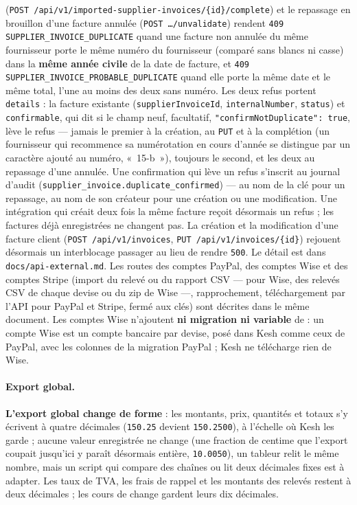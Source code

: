 \documentclass[a4paper,11pt,oneside]{article}
\begin{document}
\begin{sloppypar}
(\texttt{POST /api/v1/\allowbreak imported-supplier-invoices/\allowbreak\{id\}/\allowbreak complete}) et le repassage en brouillon d'une facture annulée (\texttt{POST …/unvalidate}) rendent \texttt{409 SUPPLIER\_\allowbreak INVOICE\_\allowbreak DUPLICATE} quand une facture non annulée du même fournisseur porte le même numéro du fournisseur (comparé sans blancs ni casse) dans la \textbf{même année civile} de la date de facture, et \texttt{409 SUPPLIER\_\allowbreak INVOICE\_\allowbreak PROBABLE\_\allowbreak DUPLICATE} quand elle porte la même date et le même total, l'une au moins des deux sans numéro. Les deux refus portent \texttt{details} : la facture existante (\texttt{supplierInvoiceId}, \texttt{internalNumber}, \texttt{status}) et \texttt{confirmable}, qui dit si le champ neuf, facultatif, \texttt{"confirmNotDuplicate": true}, lève le refus --- jamais le premier à la création, au \texttt{PUT} et à la complétion (un fournisseur qui recommence sa numérotation en cours d'année se distingue par un caractère ajouté au numéro, «~15-b~»), toujours le second, et les deux au repassage d'une annulée. Une confirmation qui lève un refus s'inscrit au journal d'audit (\texttt{supplier\_\allowbreak invoice.\allowbreak duplicate\_\allowbreak confirmed}) --- au nom de la clé pour un repassage, au nom de son créateur pour une création ou une modification. Une intégration qui créait deux fois la même facture reçoit désormais un refus ; les factures déjà enregistrées ne changent pas. La création et la modification d'une facture client (\texttt{POST /api/v1/\allowbreak invoices}, \texttt{PUT /api/v1/\allowbreak invoices/\allowbreak\{id\}}) rejouent désormais un interblocage passager au lieu de rendre \texttt{500}. Le détail est dans \texttt{docs/api-external.md}. Les routes des comptes PayPal, des comptes Wise et des comptes Stripe (import du relevé ou du rapport CSV --- pour Wise, des relevés CSV de chaque devise ou du zip de Wise ---, rapprochement, téléchargement par l'API pour PayPal et Stripe, fermé aux clés) sont décrites dans le même document. Les comptes Wise n'ajoutent \textbf{ni migration ni variable} de  : un compte Wise est un compte bancaire par devise, posé dans Kesh comme ceux de PayPal, avec les colonnes de la migration PayPal ; Kesh ne télécharge rien de Wise.
\end{sloppypar}

\paragraph{Export global.} \textbf{L'export global change de forme} : les montants, prix, quantités et totaux s'y écrivent à quatre décimales (\texttt{150.25} devient \texttt{150.2500}), à l'échelle où Kesh les garde ; aucune valeur enregistrée ne change (une fraction de centime que l'export coupait jusqu'ici y paraît désormais entière, \texttt{10.0050}), un tableur relit le même nombre, mais un script qui compare des chaînes ou lit deux décimales fixes est à adapter. Les taux de TVA, les frais de rappel et les montants des relevés restent à deux décimales ; les cours de change gardent leurs dix décimales.
\end{document}
